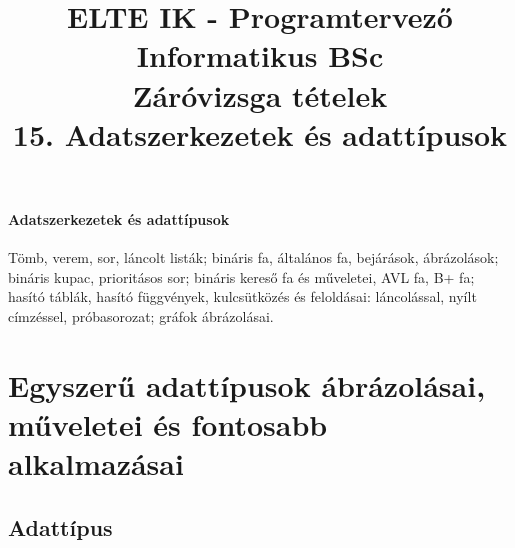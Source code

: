 \documentclass[margin=0px]{article}
\title{\textbf{{\Large ELTE IK - Programtervező Informatikus BSc} \vspace{0.2cm} \\ {\huge Záróvizsga tételek}} \vspace{0.3cm} \\ 15. Adatszerkezetek és adattípusok}
\author{}
\date{}
\newenvironment{tetel}[1]{\paragraph{#1 \\}}{}
\begin{document}
\maketitle

\begin{tetel}{Adatszerkezetek és adattípusok}
    Tömb, verem, sor, láncolt listák; bináris fa, általános fa, bejárások, ábrázolások; bináris kupac, prioritásos sor; bináris kereső fa és műveletei, AVL fa, B+ fa; hasító táblák, hasító függvények, kulcsütközés és feloldásai: láncolással, nyílt címzéssel, próbasorozat; gráfok ábrázolásai.
\end{tetel}

\section{Egyszerű adattípusok ábrázolásai, műveletei és fontosabb alkalmazásai}

\subsection{Adattípus}
\end{document}
